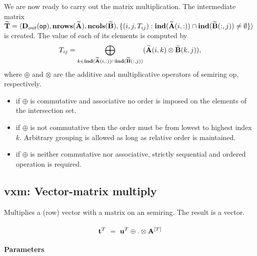 
We are now ready to carry out the matrix multiplication.
The intermediate matrix \\
${\bf \widetilde{T}} = \langle
\mbox{$\mathbf{D}_{out}$}({\sf op}), \bold{nrows}({\bf \widetilde{A}}), \bold{ncols}({\bf \widetilde{B}}),
\{(i,j,T_{ij}) : \bold{ind}({\bf \widetilde{A}}(i,:)) \cap
\bold{ind}({\bf \widetilde{B}}(:,j)) \neq \emptyset \} \rangle$
is created.  The value of each of its elements is computed by 
\[T_{ij} = \bigoplus_{k \in \bold{ind}({\bf \widetilde{A}}(i,:)) \cap
\bold{ind}({\bf \widetilde{B}}(:,j))} ({\bf \widetilde{A}}(i,k)
\otimes {\bf \widetilde{B}}(k,j)),\] where $\oplus$ and $\otimes$
are the additive and multiplicative operators of semiring {\sf op},
respectively.

\begin{itemize}
\item if $\oplus$ is commutative and associative no order is imposed on the elements of the intersection set.
\item if $\oplus$ is not commutative then the order must be from lowest to highest index $k$. Arbitrary grouping is allowed as long as relative order is maintained.
\item if $\oplus$ is neither commutative nor associative, strictly sequential and ordered operation is required.
\end{itemize}


\subsection{{\sf vxm}: Vector-matrix multiply}

Multiplies a (row) vector with a matrix on an semiring. The result is a vector.

\paragraph{\syntax}

$$
{\bf t}^T ~ = ~ {\bf u}^{T} \oplus.\otimes {\bf A}^{[T]}
$$

\paragraph{Parameters}

